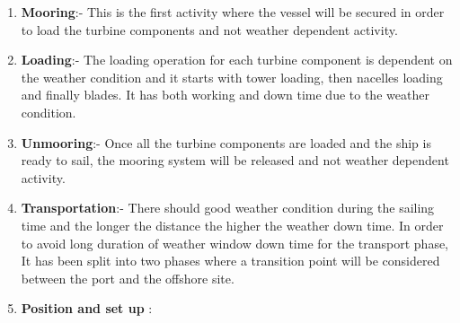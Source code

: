 \begin{enumerate}
\item \textbf{Mooring}:- This is the first activity where the vessel will be secured in order to load the turbine components and not weather dependent activity.
\item \textbf{Loading}:- The loading operation for each turbine component is dependent on the weather condition and it starts with tower loading, then nacelles loading and finally blades. It has both working and down time due to the weather condition.
\item \textbf{Unmooring}:- Once all the turbine components are loaded and the ship is ready to sail, the mooring system will be released and not weather dependent activity.
\item \textbf{Transportation}:- There should good weather condition during the sailing time and the longer the distance the higher the weather down time. In order to avoid long duration of weather window down time  for the transport phase, It has been split into two phases where a transition point will be considered between the port and the offshore site.
\item \textbf{Position and set up} : 
\end{enumerate}